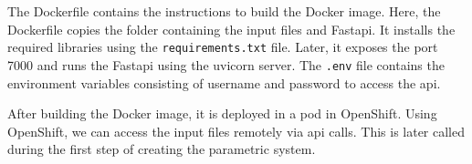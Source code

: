 The Dockerfile contains the instructions to build the Docker image. Here, the Dockerfile copies the folder containing the input files and Fast\acrshort{api}.
It installs the required libraries using the \texttt{requirements.txt} file. Later, it exposes the port 7000 and runs the Fast\acrshort{api} using the
uvicorn server. The \texttt{.env} file contains the environment variables consisting of username and password to access the \acrshort{api}. 

After building the Docker image, it is deployed in a pod in OpenShift. Using OpenShift, we can access the input files remotely via \acrshort{api} calls. This 
is later called during the first step of creating the parametric system.

